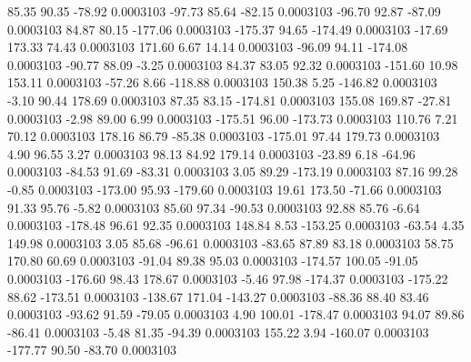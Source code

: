        85.35       90.35      -78.92     0.0003103
      -97.73       85.64      -82.15     0.0003103
      -96.70       92.87      -87.09     0.0003103
       84.87       80.15     -177.06     0.0003103
     -175.37       94.65     -174.49     0.0003103
      -17.69      173.33       74.43     0.0003103
      171.60        6.67       14.14     0.0003103
      -96.09       94.11     -174.08     0.0003103
      -90.77       88.09       -3.25     0.0003103
       84.37       83.05       92.32     0.0003103
     -151.60       10.98      153.11     0.0003103
      -57.26        8.66     -118.88     0.0003103
      150.38        5.25     -146.82     0.0003103
       -3.10       90.44      178.69     0.0003103
       87.35       83.15     -174.81     0.0003103
      155.08      169.87      -27.81     0.0003103
       -2.98       89.00        6.99     0.0003103
     -175.51       96.00     -173.73     0.0003103
      110.76        7.21       70.12     0.0003103
      178.16       86.79      -85.38     0.0003103
     -175.01       97.44      179.73     0.0003103
        4.90       96.55        3.27     0.0003103
       98.13       84.92      179.14     0.0003103
      -23.89        6.18      -64.96     0.0003103
      -84.53       91.69      -83.31     0.0003103
        3.05       89.29     -173.19     0.0003103
       87.16       99.28       -0.85     0.0003103
     -173.00       95.93     -179.60     0.0003103
       19.61      173.50      -71.66     0.0003103
       91.33       95.76       -5.82     0.0003103
       85.60       97.34      -90.53     0.0003103
       92.88       85.76       -6.64     0.0003103
     -178.48       96.61       92.35     0.0003103
      148.84        8.53     -153.25     0.0003103
      -63.54        4.35      149.98     0.0003103
        3.05       85.68      -96.61     0.0003103
      -83.65       87.89       83.18     0.0003103
       58.75      170.80       60.69     0.0003103
      -91.04       89.38       95.03     0.0003103
     -174.57      100.05      -91.05     0.0003103
     -176.60       98.43      178.67     0.0003103
       -5.46       97.98     -174.37     0.0003103
     -175.22       88.62     -173.51     0.0003103
     -138.67      171.04     -143.27     0.0003103
      -88.36       88.40       83.46     0.0003103
      -93.62       91.59      -79.05     0.0003103
        4.90      100.01     -178.47     0.0003103
       94.07       89.86      -86.41     0.0003103
       -5.48       81.35      -94.39     0.0003103
      155.22        3.94     -160.07     0.0003103
     -177.77       90.50      -83.70     0.0003103
